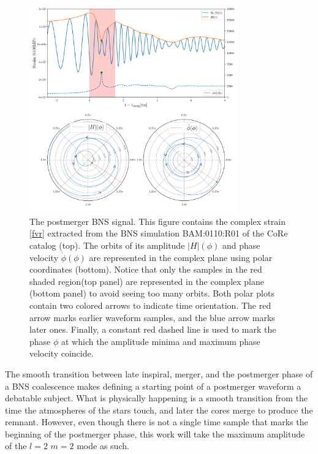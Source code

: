 \begin{figure}[hbt!]
\begin{center}
\includegraphics[width=0.8\textwidth, angle=0]{images/Data_analysis/results/postm_wf.pdf}
\end{center}
\captionsetup{width=0.8\textwidth}
\caption[The postmerger BNS signal]{The postmerger BNS signal. This figure contains the complex strain \ref{fvr} extracted from the BNS simulation BAM:0110:R01 of the CoRe catalog \cite{Dietrich:2018phi}(top). The orbits of its amplitude $|H|(\phi)$ and phase velocity $\dot{\phi}(\phi)$ are represented in the complex plane using polar coordinates (bottom). Notice that only the samples in the red shaded region(top panel) are represented in the complex plane (bottom panel) to avoid seeing too many orbits. Both polar plots contain two colored arrows to indicate time orientation. The red arrow marks earlier waveform samples, and the blue arrow marks later ones. Finally, a constant red dashed line is used to mark the phase $\phi$ at which the amplitude minima and maximum phase velocity coincide.}
\label{fig:9} 
\end{figure}

\FloatBarrier

The smooth transition between late inspiral, merger, and the postmerger phase of a BNS coalescence makes defining a starting point of a postmerger waveform a debatable subject. What is physically happening is a smooth transition from the time the atmospheres of the stars touch, and later the cores merge to produce the remnant. However, even though there is not a single time sample that marks the beginning of the postmerger phase, this work will take the maximum amplitude of the $l=2$ $m=2$ mode as such. 

